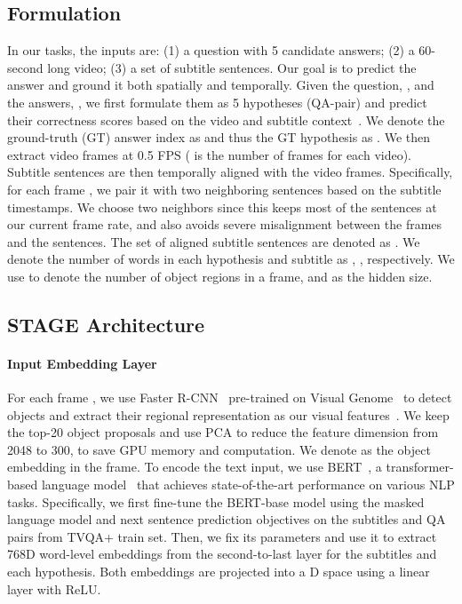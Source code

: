 \documentclass[11pt,a4paper]{article}
\begin{document}
\subsection{Formulation}\label{sec:method_formulation}
In our tasks, the inputs are: (1) a question with 5 candidate answers; (2) a 60-second long video; (3) a set of subtitle sentences. 
Our goal is to predict the answer and ground it both spatially and temporally.
Given the question, , and the answers, , we first formulate them as 5 hypotheses (QA-pair)  and predict their correctness scores based on the video and subtitle context~\cite{Onishi2016WhoDW}. 
We denote the ground-truth (GT) answer index as  and thus the GT hypothesis as .
We then extract video frames  at 0.5 FPS ( is the number of frames for each video). 
Subtitle sentences are then temporally aligned with the video frames.
Specifically, for each frame , we pair it with two neighboring sentences based on the subtitle timestamps. 
We choose two neighbors since this keeps most of the sentences at our current frame rate, and also avoids severe misalignment between the frames and the sentences.
The set of aligned subtitle sentences are denoted as . 
We denote the number of words in each hypothesis and subtitle as , , respectively. 
We use  to denote the number of object regions in a frame, and  as the hidden size. 

\subsection{STAGE Architecture}\label{sec:arch}
\paragraph{Input Embedding Layer} 
For each frame , we use Faster R-CNN~\cite{Ren2015FasterRT} pre-trained on Visual Genome~\cite{krishna2017visual} to detect objects and extract their regional representation as our visual features~\cite{Anderson2017BottomUpAT}.
We keep the top-20 object proposals and use PCA to reduce the feature dimension from 2048 to 300, to save GPU memory and computation. 
We denote  as the  object embedding in the  frame. 
To encode the text input, we use BERT~\cite{Devlin2018BERTPO}, a transformer-based language model~\cite{Vaswani2017AttentionIA} that achieves state-of-the-art performance on various NLP tasks. 
Specifically, we first fine-tune the BERT-base model using the masked language model and next sentence prediction objectives on the subtitles and QA pairs from TVQA+ train set. 
Then, we fix its parameters and use it to extract 768D word-level embeddings from the second-to-last layer for the subtitles and each hypothesis. 
Both embeddings are projected into a D space using a linear layer with ReLU.
\end{document}
